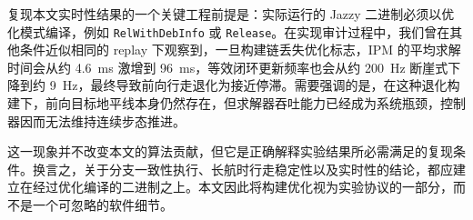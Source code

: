 复现本文实时性结果的一个关键工程前提是：实际运行的 Jazzy 二进制必须以优化模式编译，例如 \texttt{RelWithDebInfo} 或 \texttt{Release}。在实现审计过程中，我们曾在其他条件近似相同的 replay 下观察到，一旦构建链丢失优化标志，IPM 的平均求解时间会从约 4.6~ms 激增到 96~ms，等效闭环更新频率也会从约 200~Hz 断崖式下降到约 9~Hz，最终导致前向行走退化为接近停滞。需要强调的是，在这种退化构建下，前向目标地平线本身仍然存在，但求解器吞吐能力已经成为系统瓶颈，控制器因而无法维持连续步态推进。

这一现象并不改变本文的算法贡献，但它是正确解释实验结果所必需满足的复现条件。换言之，关于分支一致性执行、长航时行走稳定性以及实时性的结论，都应建立在经过优化编译的二进制之上。本文因此将构建优化视为实验协议的一部分，而不是一个可忽略的软件细节。
